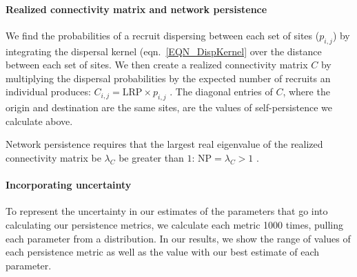 \documentclass[12pt, oneside]{article}   	%
\begin{document}
\paragraph*{Realized connectivity matrix and network persistence}
We find the probabilities of a recruit dispersing between each set of sites ($p_{i,j}$) by integrating the dispersal kernel (eqn.\ \ref{EQN_DispKernel} over the distance between each set of sites. We then create a realized connectivity matrix $C$ by multiplying the dispersal probabilities by the expected number of recruits an individual produces: $C_{i,j} = \text{LRP} \times p_{i,j}$ \citep{burgess2014beyond}. The diagonal entries of $C$, where the origin and destination are the same sites, are the values of self-persistence we calculate above. 

Network persistence requires that the largest real eigenvalue of the realized connectivity matrix be $\lambda_C$ be greater than $1$: $\text{NP} = \lambda_C > 1$ \citep[e.g.][]{hastings_persistence_2006, white_population_2010, burgess2014beyond}.

\paragraph*{Incorporating uncertainty}
To represent the uncertainty in our estimates of the parameters that go into calculating our persistence metrics, we calculate each metric 1000 times, pulling each parameter from a distribution. In our results, we show the range of values of each persistence metric as well as the value with our best estimate of each parameter. 
\end{document}
